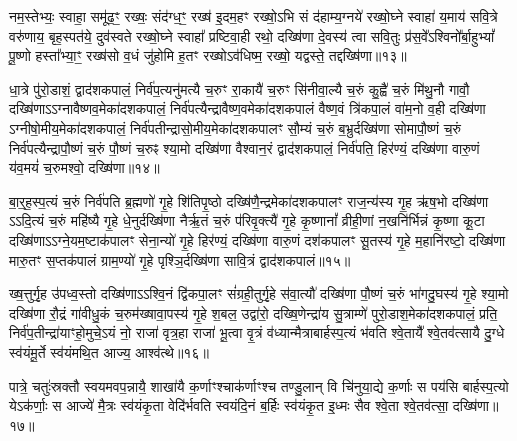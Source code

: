 नम॒स्तेभ्यः॒ स्वाहा॒ समू॑ढ॒ꣳ॒ रख्षः॒ संद॑ग्ध॒ꣳ॒ रख्ष॑ इ॒दम॒हꣳ रख्षो॒\-ऽभि सं द॑हाम्य॒ग्नये॑ रख्षो॒घ्ने स्वाहा॑ य॒माय॑ सवि॒त्रे वरु॑णाय॒ बृह॒स्पत॑ये॒ दुव॑स्वते रख्षो॒घ्ने स्वाहा᳚ प्रष्टिवा॒ही रथो॒ दख्षि॑णा दे॒वस्य॑ त्वा सवि॒तुः प्र॑स॒वे᳚\-ऽश्विनो᳚र्बा॒हु\-भ्यां᳚ पू॒ष्णो हस्ता᳚भ्या॒ꣳ॒ रख्ष॑सो व॒धं जु॑होमि ह॒तꣳ रख्षो\-ऽव॑धिष्म॒ रख्षो॒ यद्वस्ते॒ तद्दख्षि॑णा॥१३॥

{\anuvakamend[{तेभ्यः॒ पञ्च॑चत्वारिꣳशच्च॥७॥}]}

धा॒त्रे पु॑रो॒डाशं॒ द्वाद॑शकपालं॒ निर्व॑प॒त्यनु॑मत्यै च॒रुꣳ रा॒कायै॑ च॒रुꣳ सि॑नीवा॒ल्यै च॒रुं कु॒ह्वै॑ च॒रुं मि॑थु॒नौ गावौ॒ दख्षि॑णा\-ऽ\-ऽग्नावैष्णव॒मेका॑दशकपालं॒ निर्व॑पत्यैन्द्रावैष्ण॒वमेका॑दशकपालं वैष्ण॒वं त्रि॑कपा॒लं वा॑म॒नो व॒ही दख्षि॑णा \-ऽग्नीषो॒मीय॒मेका॑दशकपालं॒ निर्व॑पतीन्द्रासो॒मीय॒मेका॑दशकपालꣳ सौ॒म्यं च॒रुं ब॒भ्रुर्दख्षि॑णा सोमापौ॒ष्णं च॒रुं निर्व॑पत्यैन्द्रापौ॒ष्णं च॒रुं पौ॒ष्णं च॒रुꣴ श्या॒मो दख्षि॑णा वैश्वान॒रं द्वाद॑शकपालं॒ निर्व॑पति॒ हिर॑ण्यं॒ दख्षि॑णा वारु॒णं य॑व॒मयं॑ च॒रुमश्वो॒ दख्षि॑णा॥१४॥

{\anuvakamend[{निर॒ष्टौ च॥८॥}]}

बा॒र्॒\mbox{}ह॒स्प॒त्यं च॒रुं निर्व॑पति ब्र॒ह्मणो॑ गृ॒हे शि॑तिपृ॒ष्ठो दख्षि॑णै॒न्द्रमेका॑दशकपालꣳ राज॒न्य॑स्य गृ॒ह ऋ॑ष॒भो दख्षि॑णा \-ऽ\-ऽदि॒त्यं च॒रुं महि॑ष्यै गृ॒हे धे॒नुर्दख्षि॑णा नैर्\mbox{}ऋ॒तं च॒रुं प॑रिवृ॒क्त्यै॑ गृ॒हे कृ॒ष्णानां᳚ व्रीही॒णां न॒खनि॑र्भिन्नं कृ॒ष्णा कू॒टा दख्षि॑णा\-ऽ\-ऽग्ने॒यम॒ष्टाक॑पालꣳ सेना॒न्यो॑ गृ॒हे हिर॑ण्यं॒ दख्षि॑णा वारु॒णं दश॑कपालꣳ सू॒तस्य॑ गृ॒हे म॒हानि॑रष्टो॒ दख्षि॑णा मारु॒तꣳ स॒प्तक॑पालं ग्राम॒ण्यो॑ गृ॒हे पृश्ञि॒र्दख्षि॑णा सावि॒त्रं द्वाद॑शकपालं॥१५॥

ख्ष॒त्तुर्गृ॒ह उ॑पध्व॒स्तो दख्षि॑णा\-ऽ\-ऽश्वि॒नं द्वि॑कपा॒लꣳ सं॑ग्रही॒तुर्गृ॒हे स॑वा॒त्यौ॑ दख्षि॑णा पौ॒ष्णं च॒रुं भा॑गदु॒घस्य॑ गृ॒हे श्या॒मो दख्षि॑णा रौ॒द्रं गा॑वीधु॒कं च॒रुम॑ख्षावा॒पस्य॑ गृ॒हे श॒बल॒ उद्वा॑रो॒ दख्षि॒णेन्द्रा॑य सु॒त्राम्णे॑ पुरो॒डाश॒मेका॑दशकपालं॒ प्रति॒ निर्व॑प॒तीन्द्रा॑याꣳहो॒मुचे॒\-ऽयं नो॒ राजा॑ वृत्र॒हा राजा॑ भू॒त्वा वृ॒त्रं व॑ध्यान्मैत्राबार्\mbox{}हस्प॒त्यं भ॑वति श्वे॒तायै᳚ श्वे॒तव॑त्सायै दु॒ग्धे स्व॑यंमू॒र्ते स्व॑यंमथि॒त आज्य॒ आश्व॑त्थे॥१६॥

पात्रे॒ चतुः॑स्रक्तौ स्वयमवप॒न्नायै॒ शाखा॑यै क॒र्णाꣳश्चाक॑र्णाꣳश्च तण्डु॒लान् वि चि॑नुया॒द्ये क॒र्णाः स पय॑सि बार्\mbox{}हस्प॒त्यो ये\-ऽक॑र्णाः॒ स आज्ये॑ मै॒त्रः स्व॑यंकृ॒ता वेदि॑र्भवति स्वयंदि॒नं ब॒र्\mbox{}हिः स्व॑यंकृ॒त इ॒ध्मः सैव श्वे॒ता श्वे॒तव॑त्सा॒ दख्षि॑णा॥१७॥

{}

